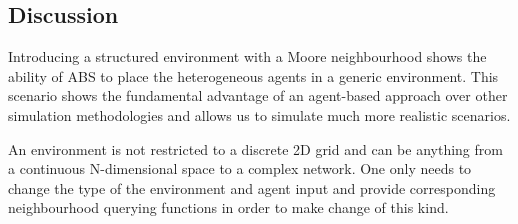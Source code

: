 \subsection{Discussion}
Introducing a structured environment with a Moore neighbourhood shows the ability of ABS to place the heterogeneous agents in a generic environment. This scenario shows the fundamental advantage of an agent-based approach over other simulation methodologies and allows us to simulate much more realistic scenarios.

An environment is not restricted to a discrete 2D grid and can be anything from a continuous N-dimensional space to a complex network. One only needs to change the type of the environment and agent input and provide corresponding neighbourhood querying functions in order to make change of this kind. 